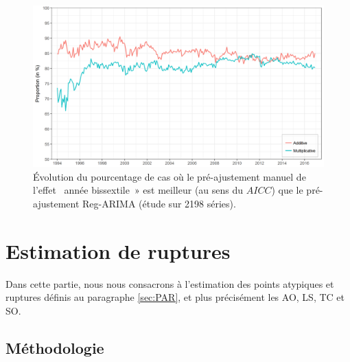 \documentclass[12pt, a4paper, french]{article}
\begin{document}
\begin{figure}[!ht]
\begin{center}
 \includegraphics[scale=0.65]{img/LYaicc.png}
 \caption{Évolution du pourcentage de cas où le pré-ajustement manuel de l'effet \og~année bissextile~» est meilleur (au sens du $AICC$) que le pré-ajustement Reg-ARIMA (étude sur 2198 séries).}
 \label{fig:LYaicc}
\end{center}
\end{figure}

\clearpage

\section{Estimation de ruptures}
\label{sec:AO}

Dans cette partie, nous nous consacrons à l'estimation des points atypiques et ruptures définis au paragraphe \ref{sec:PAR}, et plus précisément les AO, LS, TC et SO.

\subsection{Méthodologie}
\end{document}
